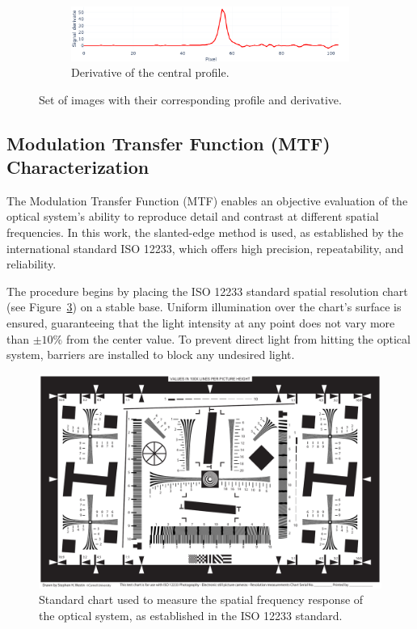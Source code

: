 \begin{figure}[H]
    \begin{subfigure}[b]{0.95\linewidth}
        \centering
        \includegraphics[width=\linewidth]{Figures/C3/SE_diff.png}
        \caption{Derivative of the central profile.}
        \label{fig:se_diff}
    \end{subfigure}
    
    \caption{Set of images with their corresponding profile and derivative.}
    \label{fig:enfoque_conjunta}
\end{figure}

\subsection{Modulation Transfer Function (MTF) Characterization}
\label{sec:mtf_char}
The Modulation Transfer Function (MTF) enables an objective evaluation of the optical system’s ability to reproduce detail and contrast at different spatial frequencies. In this work, the slanted-edge method is used, as established by the international standard ISO 12233, which offers high precision, repeatability, and reliability.

The procedure begins by placing the ISO 12233 standard spatial resolution chart (see Figure~\ref{fig:iso12233_test_chart}) on a stable base. Uniform illumination over the chart’s surface is ensured, guaranteeing that the light intensity at any point does not vary more than $\pm 10\%$ from the center value. To prevent direct light from hitting the optical system, barriers are installed to block any undesired light.

\begin{figure}[H]
    \centering
    \includegraphics[width=0.95\linewidth]{Figures/C3/ISO_12233-reschart.pdf}
    \caption{Standard chart used to measure the spatial frequency response of the optical system, as established in the ISO 12233 standard.}
    \label{fig:iso12233_test_chart}
\end{figure}


